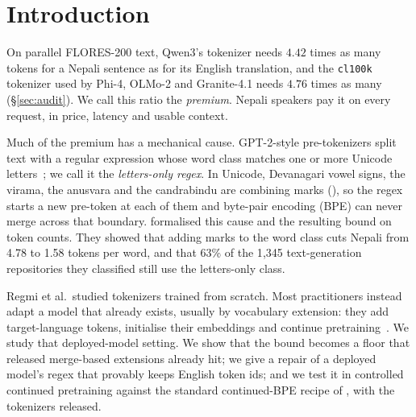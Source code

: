 \section{Introduction}

On parallel FLORES-200 text, Qwen3's tokenizer needs $4.42$ times as many tokens for a Nepali sentence as for its English translation, and the \texttt{cl100k} tokenizer used by Phi-4, OLMo-2 and Granite-4.1 needs $4.76$ times as many (\S\ref{sec:audit}). We call this ratio the \emph{premium}. Nepali speakers pay it on every request, in price, latency and usable context.

Much of the premium has a mechanical cause. GPT-2-style pre-tokenizers split text with a regular expression whose word class \pL{} matches one or more Unicode letters~\citep{gpt2encoder}; we call it the \emph{letters-only regex}. In Unicode, Devanagari vowel signs, the virama, the anusvara and the candrabindu are combining marks (\pM{}), so the regex starts a new pre-token at each of them and byte-pair encoding (BPE) can never merge across that boundary. \citet{regmi2026vowel} formalised this cause and the resulting bound on token counts. They showed that adding marks to the word class cuts Nepali from 4.78 to 1.58 tokens per word, and that 63\% of the 1{,}345 text-generation repositories they classified still use the letters-only class.

Regmi et al.\ studied tokenizers trained from scratch. Most practitioners instead adapt a model that already exists, usually by vocabulary extension: they add target-language tokens, initialise their embeddings and continue pretraining~\citep{tejaswi-etal-2024-exploring,yamaguchi2026lowres,purason-etal-2026-teaching,smith2026inplace}. We study that deployed-model setting. We show that the bound becomes a floor that released merge-based extensions already hit; we give a repair of a deployed model's regex that provably keeps English token ids; and we test it in controlled continued pretraining against the standard continued-BPE recipe of \citet{purason-etal-2026-teaching}, with the tokenizers released.

